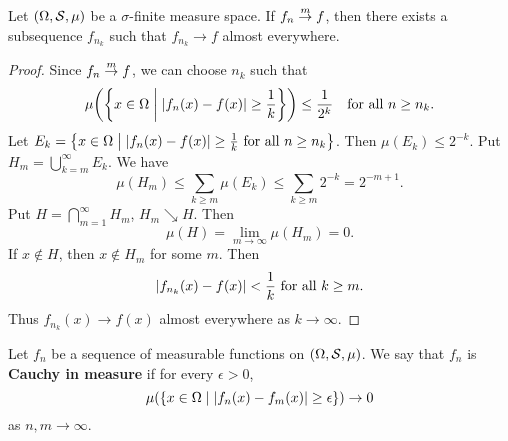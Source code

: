 \begin{theorem}\label{thm:mconv_subseq}
    Let $(\Omega, \S, \mu)$ be a $\sigma$-finite measure space. If $f_n\mto f$, then 
    there exists a subsequence $f_{n_k}$ such that $f_{n_k}\to f$ almost everywhere.
\end{theorem}
\begin{proof}
    Since $f_n\mto f$, we can choose $n_k$ such that 
    \begin{equation*}
        \mu\pth{\Set{x\in\Omega}{\abs{f_n(x) - f(x)}\geq \frac{1}{k}}} \leq \frac{1}{2^k}
        \quad\text{for all } n\geq n_k.
    \end{equation*}
    Let $E_k = \Set{x\in\Omega}{\abs{f_{n}(x) - f(x)}\geq \frac{1}{k}\text{ for all $n\geq n_k$}}$. 
    Then $\mu(E_k)\leq 2^{-k}$. Put $H_m = \bigcup_{k=m}^\infty E_k$. We have 
    \begin{equation*}
        \mu(H_m) \leq \sum_{k\geq m} \mu(E_k) \leq \sum_{k\geq m} 2^{-k} = 2^{-m+1}.
    \end{equation*}
    Put $H = \bigcap_{m=1}^\infty H_m$, $H_m\searrow H$. Then 
    \begin{equation*}
        \mu(H) = \lim_{m\to\infty} \mu(H_m) = 0.
    \end{equation*}
    If $x\notin H$, then $x\notin H_m$ for some $m$. Then 
    \begin{equation*}
        \abs{f_{n_k}(x) - f(x)} < \frac{1}{k} \text{ for all } k\geq m.
    \end{equation*}
    Thus $f_{n_k}(x)\to f(x)$ almost everywhere as $k\to\infty$.
\end{proof}

\begin{definition}
    Let $f_n$ be a sequence of measurable functions on $(\Omega, \S, \mu)$. 
    We say that $f_n$ is \textbf{Cauchy in measure} if for every $\epsilon>0$, 
    \begin{equation*}
        \mu\pth{\Set{x\in\Omega}{\abs{f_n(x)-f_m(x)}\geq \epsilon}} \to 0
    \end{equation*}
    as $n,m\to\infty$. 
\end{definition}

